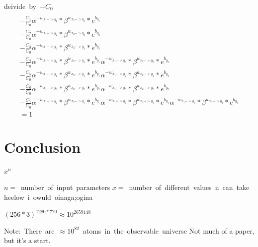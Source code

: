 \documentclass{article}
\begin{document}
\hbox{deivide by $-C_0$}
\begin{multline}\\
    - \frac{C_1}{C_0}\alpha^{-w_{x_1->y_1}}*\beta^{w_{x_2->y_1}} *e^{b_{y_1}}\\
    - \frac{C_2}{C_0}\alpha^{-w_{x_1->y_2}}*\beta^{w_{x_2->y_2}} *e^{b_{y_2}}\\
    - \frac{C_3}{C_0}\alpha^{-w_{x_1->y_3}}*\beta^{w_{x_2->y_3}} *e^{b_{y_3}}\\
    - \frac{C_4}{C_0}\alpha^{-w_{x_1->y_1}}*\beta^{w_{x_2->y_1}} *e^{b_{y_1}} \alpha^{-w_{x_1->y_3}}*\beta^{w_{x_2->y_3}} *e^{b_{y_3}}\\
    - \frac{C_5}{C_0}\alpha^{-w_{x_1->y_1}}*\beta^{w_{x_2->y_1}} *e^{b_{y_1}} \alpha^{-w_{x_1->y_2}}*\beta^{w_{x_2->y_2}} *e^{b_{y_2}}\\
    - \frac{C_6}{C_0}\alpha^{-w_{x_1->y_2}}*\beta^{w_{x_2->y_2}} *e^{b_{y_2}} \alpha^{-w_{x_1->y_3}}*\beta^{w_{x_2->y_3}} *e^{b_{y_3}}\\
    - \frac{C_7}{C_0}\alpha^{-w_{x_1->y_1}}*\beta^{w_{x_2->y_1}} *e^{b_{y_1}} \alpha^{-w_{x_1->y_2}}*\beta^{w_{x_2->y_2}} *e^{b_{y_2}} \alpha^{-w_{x_1->y_3}}*\beta^{w_{x_2->y_3}}*e^{b_{y_3}}\\
    = 1
\end{multline}


\section{Conclusion}

$x^n$

\hbox{$n =$ number of input parameters}
\hbox{$x =$ number of different values n can take}
\hbox{heelow i owuld oinaga;ogina}


$(256*3)^{1280*720} \approx 10^{2659148}$

\hbox{Note: There are $\approx 10^{82}$ atoms in the observable universe}
Not much of a paper, but it's a start.
\end{document}
